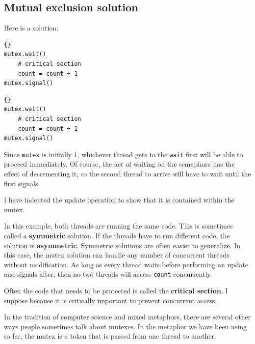 \documentclass{book}
\newcommand{\clearemptydoublepage}{\newpage\cleardoublepage}
\begin{document}
\clearemptydoublepage
\subsection{Mutual exclusion solution}

Here is a solution:

\begin{latin}
\begin{minipage}[t]{2in}
\begin{latin}
\begin{lstlisting}[title=\rl{نخ \lr{A}}]{}
mutex.wait()
    # critical section
    count = count + 1
mutex.signal()
\end{lstlisting}
\end{latin}
\end{minipage}
\hfill
\begin{minipage}[t]{2in}
\begin{latin}
\begin{lstlisting}[title=\rl{نخ \lr{B}}]{}
mutex.wait()
    # critical section
    count = count + 1
mutex.signal()
\end{lstlisting}
\end{latin}
\end{minipage}
\end{latin}

Since {\tt mutex} is initially 1, whichever thread gets to
the {\tt wait} first will be able to proceed immediately.
Of course, the act of waiting on the semaphore has the effect
of decrementing it, so the second thread to
arrive will have to wait until the first signals.

I have indented the update operation to show that it is contained
within the mutex.

In this example, both threads are running the same code.  This is
sometimes called a {\bf symmetric} solution.  If the threads have to
run different code, the solution is {\bf asymmetric}.  Symmetric
solutions are often easier to generalize.  In this case, the mutex
solution can handle any number of concurrent threads without
modification.  As long as every thread waits before 
performing an update and signals after, then no two threads
will access {\tt count} concurrently.

Often the code that needs to be protected is called the
{\bf critical section}, I suppose because it is critically
important to prevent concurrent access.

In the tradition of computer science and mixed metaphors, there
are several other ways people sometimes talk about mutexes.  In
the metaphor we have been using so far, the mutex is a token
that is passed from one thread to another.
\end{document}
